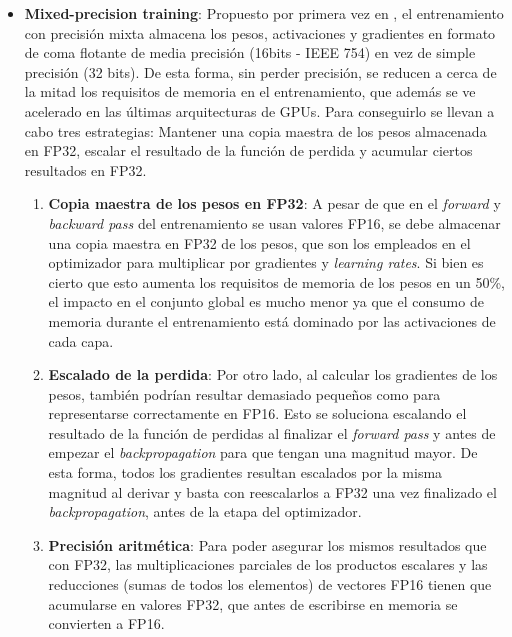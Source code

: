 \begin{itemize}
    \item \textbf{Mixed-precision training}: Propuesto por primera vez en \cite{micikevicius2018mixed}, el entrenamiento con precisión mixta almacena los pesos, activaciones y gradientes en formato de coma flotante de media precisión (16bits - IEEE 754) en vez de simple precisión (32 bits). De esta forma, sin perder precisión, se reducen a cerca de la mitad los requisitos de memoria en el entrenamiento, que además se ve acelerado en las últimas arquitecturas de GPUs. 
    Para conseguirlo se llevan a cabo tres estrategias: Mantener una copia maestra de los pesos almacenada en FP32, escalar el resultado de la función de perdida y acumular ciertos resultados en FP32.
    \begin{enumerate}
    \item \textbf{Copia maestra de los pesos en FP32}: A pesar de que en el \textit{forward} y \textit{backward pass} del entrenamiento se usan valores FP16, se debe almacenar una copia maestra en FP32 de los pesos, que son los empleados en el optimizador para multiplicar por gradientes y \textit{learning rates}. Si bien es cierto que esto aumenta los requisitos de memoria de los pesos en un 50\%, el impacto en el conjunto global es mucho menor ya que el consumo de memoria durante el entrenamiento está dominado por las activaciones de cada capa.
    \item \textbf{Escalado de la perdida}: Por otro lado, al calcular los gradientes de los pesos, también podrían resultar demasiado pequeños como para representarse correctamente en FP16. Esto se soluciona escalando el resultado de la función de perdidas al finalizar el \textit{forward pass} y antes de empezar el \textit{backpropagation} para que tengan una magnitud mayor. De esta forma, todos los gradientes resultan escalados por la misma magnitud al derivar y basta con reescalarlos a FP32 una vez finalizado el \textit{backpropagation}, antes de la etapa del optimizador.
    \item \textbf{Precisión aritmética}: Para poder asegurar los mismos resultados que con FP32, las multiplicaciones parciales de los productos escalares y las reducciones (sumas de todos los elementos) de vectores FP16 tienen que acumularse en valores FP32, que antes de escribirse en memoria se convierten a FP16.
    \end{enumerate}
\end{itemize}

\clearpage
